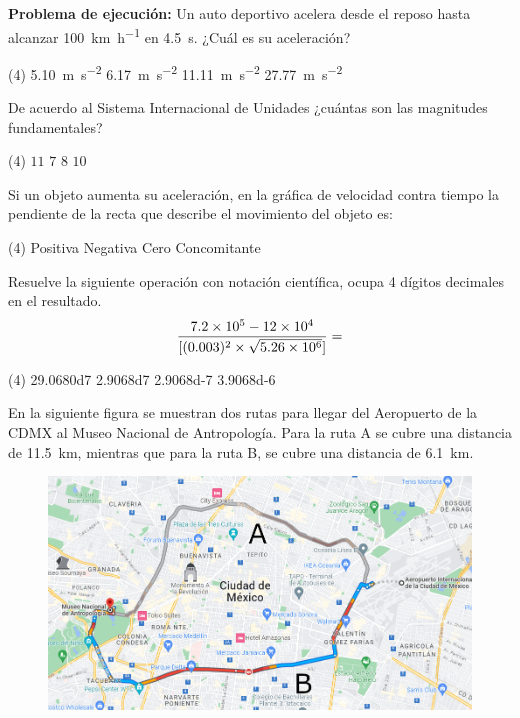 \documentclass[12pt, letter]{exam}
\begin{document}
\begin{questions}
{}
    \question \textbf{Problema de ejecución:} Un auto deportivo acelera desde el reposo hasta alcanzar \SI{100}{\kilo\meter\per\hour} en \SI{4.5}{\second}. ¿Cuál es su aceleración?
    \begin{tasks}(4)
        \task \SI{5.10}{\meter\per\square\second}
        \task \SI{6.17}{\meter\per\square\second}
        \task \SI{11.11}{\meter\per\square\second}
        \task \SI{27.77}{\meter\per\square\second}
    \end{tasks}
    \question De acuerdo al Sistema Internacional de Unidades ¿cuántas son las magnitudes fundamentales?
    \begin{tasks}(4)
        \task $11$
        \task $7$
        \task $8$
        \task $10$
    \end{tasks}
    \question Si un objeto aumenta su aceleración, en la gráfica de velocidad contra tiempo la pendiente de la recta que describe el movimiento del objeto es:
    \begin{tasks}(4)
        \task Positiva
        \task Negativa
        \task Cero
        \task Concomitante        
    \end{tasks}
    \question Resuelve la siguiente operación con notación científica, ocupa 4 dígitos decimales en el resultado.
    \begin{align*}
    \dfrac{\num{7.2d5} - \num{12e4}}{[(0.003)^{2}  \times \sqrt{\num{5.26d6}}]} =
    \end{align*}
    \begin{tasks}(4)
        \task \num{29.0680d7}
        \task \num{2.9068d7}
        \task \num{2.9068d-7}
        \task \num{3.9068d-6}
    \end{tasks}
    \question En la siguiente figura se muestran dos rutas para llegar del Aeropuerto de la CDMX al Museo Nacional de Antropología. Para la ruta A se cubre una distancia de \SI{11.5}{\kilo\meter}, mientras que para la ruta B, se cubre una distancia de \SI{6.1}{\kilo\meter}.
    \begin{figure}[H]
        \centering
        \includegraphics[scale=0.5]{Imagenes/Trayectoria_03.png}

\end{figure}
\end{questions}
\end{document}
